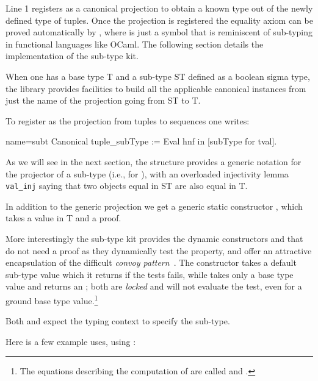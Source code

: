 Line 1 registers  as a canonical projection to obtain a known
type out of the newly defined type of tuples.  Once the projection
is registered the equality axiom can be proved automatically by
, where \C{<:} is just a symbol
that is reminiscent of sub-typing in functional languages like OCaml.
The following section details the implementation of the sub-type kit.

\mcbREQUIRE{}

When one has a base type T and a sub-type ST defined as a boolean
sigma type, the \mcbMC{} library provides facilities to
build all the applicable canonical instances from just
the name of the projection going from ST to T.

To register  as the projection from tuples to sequences one
writes:

\begin{coq}{name=subt}{}
Canonical tuple_subType := Eval hnf in [subType for tval].
\end{coq}

As we will see in the next section, the  structure provides
a generic notation  for the projector of a sub-type (i.e.,
 for ), with an overloaded injectivity lemma
\lstinline/val_inj/ saying that two objects equal in ST are also equal
in T.

In addition to the generic projection we get a generic static
constructor , which takes a value in T and a proof.

More interestingly the sub-type kit provides the dynamic constructors
 and  that do not need a proof as they dynamically
test the property, and offer
an attractive encapsulation of the difficult \emph{convoy
pattern}~\cite[section 8.4]{CPDT}.
The  constructor takes a default
sub-type value which it returns if the tests fails, while 
takes only a base type value and returns an ; both are
\emph{locked} and will not evaluate the test, even for a ground base
type value.\footnote{The equations describing the computation
of  are called  and .}

Both  and  expect the typing context to
specify the sub-type.

Here is a few example uses, using :

